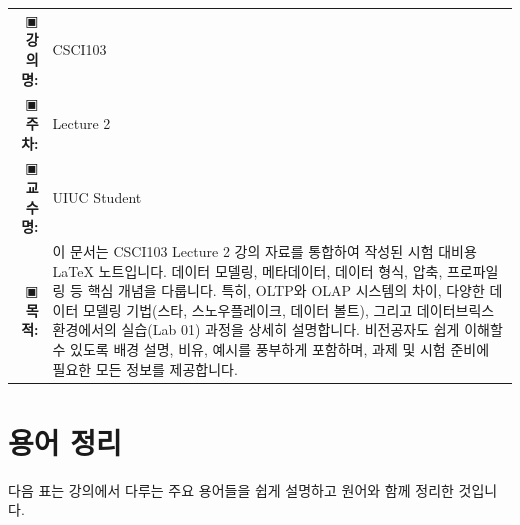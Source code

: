 \documentclass[11pt,a4paper]{article}
\makeatletter
\theoremstyle{definition}
\newcommand{\metainfo}[4]{
\begin{tcolorbox}[
    colback=lightpurple,
    colframe=darkpurple,
    boxrule=1pt,
    arc=2mm,
    left=10pt,
    right=10pt,
    top=8pt,
    bottom=8pt
]
\begin{tabular}{@{}rl@{}}
▣ \textbf{강의명:} & #1 \\[0.3em]
▣ \textbf{주차:} & #2 \\[0.3em]
▣ \textbf{교수명:} & #3 \\[0.3em]
▣ \textbf{목적:} & \begin{minipage}[t]{0.75\textwidth}#4\end{minipage}
\end{tabular}
\end{tcolorbox}
}
\makeatother
\begin{document}
\thispagestyle{firstpage}

\metainfo{CSCI103}{Lecture 2}{UIUC Student}{이 문서는 CSCI103 Lecture 2 강의 자료를 통합하여 작성된 시험 대비용 LaTeX 노트입니다. 데이터 모델링, 메타데이터, 데이터 형식, 압축, 프로파일링 등 핵심 개념을 다룹니다. 특히, OLTP와 OLAP 시스템의 차이, 다양한 데이터 모델링 기법(스타, 스노우플레이크, 데이터 볼트), 그리고 데이터브릭스 환경에서의 실습(Lab 01) 과정을 상세히 설명합니다. 비전공자도 쉽게 이해할 수 있도록 배경 설명, 비유, 예시를 풍부하게 포함하며, 과제 및 시험 준비에 필요한 모든 정보를 제공합니다.}

\tableofcontents

\newpage

\section{용어 정리}

다음 표는 강의에서 다루는 주요 용어들을 쉽게 설명하고 원어와 함께 정리한 것입니다.
\end{document}
